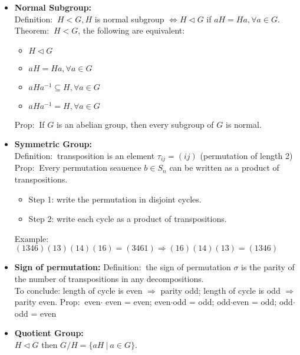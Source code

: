 \documentclass[12pt]{article}
\newcommand{\theo}{{\color{blue} Theorem: $\ $}}
\newcommand{\defi}{{\color{blue} Definition: $\ $}}
\newcommand{\exe}{{\color{green} Example: $\ $}}
\newcommand{\prop}{{\color{blue} Prop: $\ $}}
\begin{document}
\begin{itemize}
        \defi $H < G$, $[G:H]:=$ \# of left cosets of $H$ in $G$\\
        \textbf{Properties:} $|G| = [G:H] \cdot |H| \Leftrightarrow [G:H] = |G|/|H|$\\
        In general, $aH \ne Ha$, sometimes they are the same.
        \item \textbf{Normal Subgroup:}\\
        \defi $H <G, H$ is normal subgroup $\Leftrightarrow H \triangleleft G$ if $aH = Ha, \forall a \in G$.\\
        \theo $H < G$, the following are equivalent:
        \begin{itemize}
            \item $H \triangleleft G$
            \item $aH = Ha, \forall a \in G$
            \item $aHa^{-1} \subseteq H, \forall a \in G$
            \item $aHa^{-1} = H, \forall a \in G$
        \end{itemize}
        \prop If $G$ is an abelian group, then every subgroup of $G$ is normal.
    \item \textbf{Symmetric Group:}\\
        \defi transposition is an element $\tau_{ij} = (ij)$ (permutation of length 2)\\
        \prop Every permutation seauence $b \in S_n$ can be written as a product of transpositions.
        \begin{itemize}
            \item Step 1: write the permutation in disjoint cycles.
            \item Step 2: write each cycle as a product of transpositions.
        \end{itemize}
        \exe $(1346)(13)(14)(16) = (3461) \Rightarrow (16)(14)(13) = (1346)$
    \item \textbf{Sign of permutation:}
        \defi the sign of permutation $\sigma$ is the parity of the number of transpositions in any decompositions.\\
        To conclude: length of cycle is even $\Rightarrow$ parity odd; length of cycle is odd $\Rightarrow$ parity even.
        \prop even$\cdot$ even = even; even$\cdot$odd = odd; odd$\cdot$even = odd; odd$\cdot$odd = even
    \item \textbf{Quotient Group:}\\
    $H \triangleleft G$ then $G/H = \{aH \ | \ a \in G\}$. \\

\end{itemize}
\end{document}
